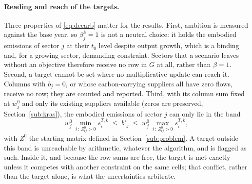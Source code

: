 \documentclass[11pt,a4paper]{article}
\begin{document}
\paragraph{Reading and reach of the targets.}
Three properties of \eqref{eq:decarb} matter for the results. First, ambition is measured against the base year, so $\beta^k_j = 1$ is not a neutral choice: it holds the embodied emissions of sector $j$ at their $t_0$ level despite output growth, which is a binding and, for a growing sector, demanding constraint. Sectors that a scenario leaves without an objective therefore receive no row in $G$ at all, rather than $\beta = 1$. Second, a target cannot be set where no multiplicative update can reach it. Columns with $b_j = 0$, or whose carbon-carrying suppliers all have zero flows, receive no row; they are counted and reported. Third, with its column sum fixed at $w^0_j$ and only its existing suppliers available (zeros are preserved, Section~\ref{sub:kras}), the embodied emissions of sector $j$ can only lie in the band
\begin{equation}\label{eq:band}
  w^0_j \, \min_{i \,:\, Z^0_{ij} > 0} s^{T,k}_i
  \;\le\; b'_j \;\le\;
  w^0_j \, \max_{i \,:\, Z^0_{ij} > 0} s^{T,k}_i ,
\end{equation}
with $Z^0$ the starting matrix defined in Section~\ref{sub:problem}. A target outside this band is unreachable by arithmetic, whatever the algorithm, and is flagged as such. Inside it, and because the row sums are free, the target is met exactly unless it competes with another constraint on the same cells; that conflict, rather than the target alone, is what the uncertainties arbitrate.

\end{document}
